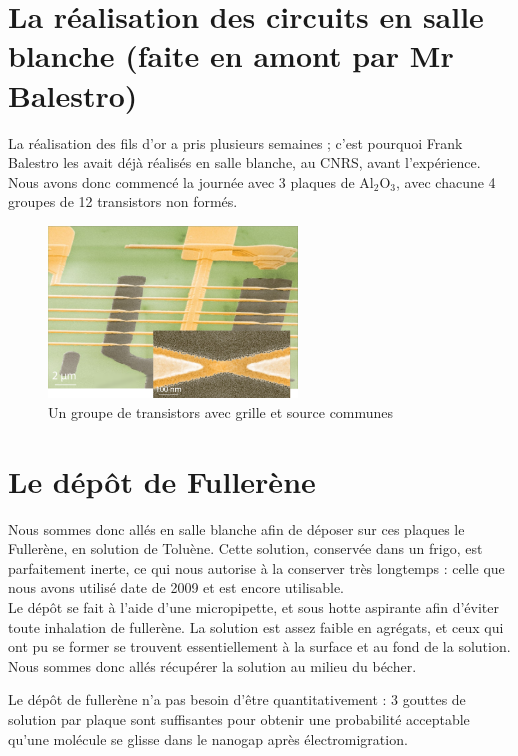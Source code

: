 \section{La réalisation des circuits en salle blanche (faite en amont par Mr Balestro)}
La réalisation des fils d’or a pris plusieurs semaines ; c’est pourquoi Frank Balestro les avait déjà réalisés en salle blanche, au CNRS, avant l’expérience.
Nous avons donc commencé la journée avec 3 plaques de Al$_2$O$_3$, avec chacune 4 groupes de 12 transistors non formés.
\begin{figure}[h]
    \begin{center}
        \includegraphics[width=250px]{Images/GroupeDeTransistors}
        \caption{Un groupe de transistors avec grille et source communes}
        \label{fig:}
    \end{center}
\end{figure}
\section{Le dépôt de Fullerène}
Nous sommes donc allés en salle blanche afin de déposer sur ces plaques le Fullerène, en solution de Toluène.
Cette solution, conservée dans un frigo, est parfaitement inerte, ce qui nous autorise à la conserver très longtemps : celle que nous avons utilisé date de 2009 et est encore utilisable.\\

Le dépôt se fait à l’aide d’une micropipette, et sous hotte aspirante afin d’éviter toute inhalation de fullerène.
La solution est assez faible en agrégats, et ceux qui ont pu se former se trouvent essentiellement à la surface et au fond de la solution. Nous sommes donc allés récupérer la solution au milieu du bécher.

Le dépôt de fullerène n’a pas besoin d’être quantitativement : 3 gouttes de solution par plaque sont suffisantes pour obtenir une probabilité acceptable qu’une molécule se glisse dans le nanogap après électromigration.

